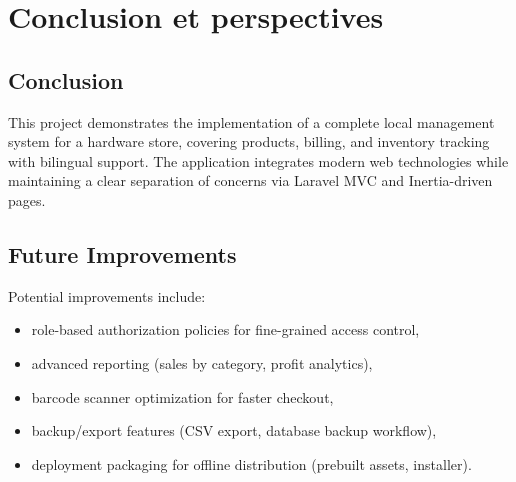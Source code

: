 \documentclass[12pt,a4paper]{report}
\begin{document}
\chapter{Conclusion et perspectives}

\section{Conclusion}
This project demonstrates the implementation of a complete local management system for a hardware store, covering products, billing, and inventory tracking with bilingual support. The application integrates modern web technologies while maintaining a clear separation of concerns via Laravel MVC and Inertia-driven pages.

\section{Future Improvements}
Potential improvements include:
\begin{itemize}
  \item role-based authorization policies for fine-grained access control,
  \item advanced reporting (sales by category, profit analytics),
  \item barcode scanner optimization for faster checkout,
  \item backup/export features (CSV export, database backup workflow),
  \item deployment packaging for offline distribution (prebuilt assets, installer).
\end{itemize}
\end{document}
